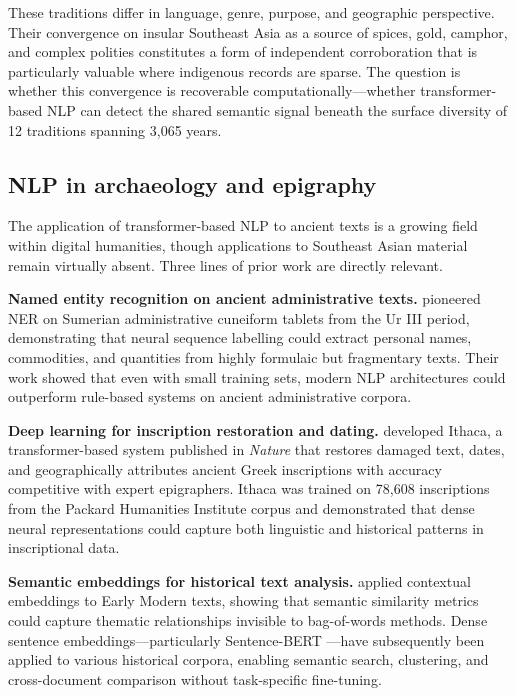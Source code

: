 \documentclass[12pt]{article}
\begin{document}
These traditions differ in language, genre, purpose, and geographic perspective.
Their convergence on insular Southeast Asia as a source of spices, gold, camphor, and complex polities constitutes a form of independent corroboration that is particularly valuable where indigenous records are sparse.
The question is whether this convergence is recoverable computationally---whether transformer-based NLP can detect the shared semantic signal beneath the surface diversity of 12 traditions spanning 3,065 years.

\subsection{NLP in archaeology and epigraphy}

The application of transformer-based NLP to ancient texts is a growing field within digital humanities, though applications to Southeast Asian material remain virtually absent.
Three lines of prior work are directly relevant.

\textbf{Named entity recognition on ancient administrative texts.}
\citet{PagePerron2017} pioneered NER on Sumerian administrative cuneiform tablets from the Ur III period, demonstrating that neural sequence labelling could extract personal names, commodities, and quantities from highly formulaic but fragmentary texts.
Their work showed that even with small training sets, modern NLP architectures could outperform rule-based systems on ancient administrative corpora.

\textbf{Deep learning for inscription restoration and dating.}
\citet{Assael2022} developed Ithaca, a transformer-based system published in \textit{Nature} that restores damaged text, dates, and geographically attributes ancient Greek inscriptions with accuracy competitive with expert epigraphers.
Ithaca was trained on 78,608 inscriptions from the Packard Humanities Institute corpus and demonstrated that dense neural representations could capture both linguistic and historical patterns in inscriptional data.

\textbf{Semantic embeddings for historical text analysis.}
\citet{Manjavacas2019} applied contextual embeddings to Early Modern texts, showing that semantic similarity metrics could capture thematic relationships invisible to bag-of-words methods.
Dense sentence embeddings---particularly Sentence-BERT \citep{Reimers2019}---have subsequently been applied to various historical corpora, enabling semantic search, clustering, and cross-document comparison without task-specific fine-tuning.
\end{document}
